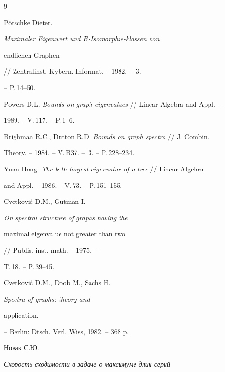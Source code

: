 \begin{thebibliography}{9} 


 




P\"otschke Dieter. {\em Maximaler Eigenwert und $R$-Isomorphie-klassen von 


endlichen Graphen} // Zentralinst. Kybern. Informat. -- 1982. -- \No\,3. 


-- P.\,14--50. 


 




Powers D.L. {\em Bounds on graph eigenvalues} // Linear Algebra and Appl. -- 


1989. -- V.\,117. -- P.\,1--6. 


 




Brighman R.C., Dutton R.D. {\em Bounds on graph spectra} // J. Combin. 


Theory. -- 1984. -- V.\,B37. -- \No\,3. -- P.\,228--234. 


 




Yuan Hong. {\em The $k$-th largest eigenvalue of a tree} // Linear Algebra 


and Appl. -- 1986. -- V.\,73. -- P.\,151--155. 


 




Cvetkovi\'c D.M., Gutman I. {\em On spectral structure of graphs having the 


maximal eigenvalue not greater than two} // Publis. inst. math. -- 1975. -- 


T.\,18. -- P.\,39--45. 


 




Cvetkovi\'c D.M., Doob M., Sachs H. {\em Spectra of graphs: theory and 


application.} -- Berlin: Dtsch. Verl. Wiss, 1982. -- 368 p. 


 




Новак С.Ю. {\em Скорость сходимости в задаче о максимуме длин серий 


}
\end{thebibliography}
